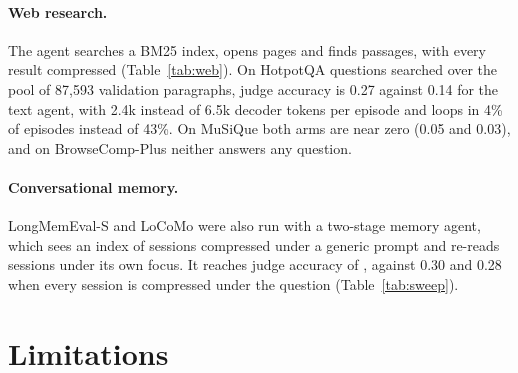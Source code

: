 \documentclass[11pt]{article}
\begin{document}
\begin{table}[!ht]
\centering
\small

\caption{Bug localisation on SWE-bench Lite without Django (186 instances). Gold file named: the final
answer names a file edited by the reference patch (count in parentheses). Answered: the episode ends
with a file answer. Looped: the episode was stopped for a repeated call. Decoder tokens: per
episode.}
\label{tab:swe}
\end{table}

\paragraph{Web research.}
The agent searches a BM25 index, opens pages and finds passages, with every result compressed
(Table~\ref{tab:web}). On HotpotQA questions searched over the pool of 87{,}593 validation paragraphs,
judge accuracy is 0.27 against 0.14 for the text agent, with 2.4k instead of 6.5k decoder tokens per
episode and loops in 4\% of episodes instead of 43\%. On MuSiQue both arms are near zero (0.05 and
0.03), and on BrowseComp-Plus \citep{chen2025browsecompplus} neither answers any question.

\begin{table}[!ht]
\centering
\small

\caption{Web research (100 questions each). HotpotQA and MuSiQue search the pooled paragraphs of
their validation sets; BrowseComp-Plus searches its fixed web corpus.}
\label{tab:web}
\end{table}

\paragraph{Conversational memory.}
LongMemEval-S and LoCoMo were also run with a two-stage memory agent, which sees an index of sessions
compressed under a generic prompt and re-reads sessions under its own focus. It reaches judge accuracy
of \unskip, against 0.30 and 0.28 when every session is compressed under
the question (Table~\ref{tab:sweep}).

\section{Limitations}
\end{document}

